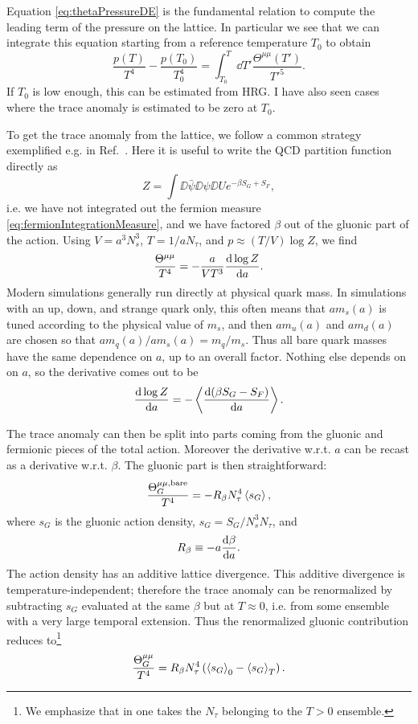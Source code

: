Equation \eqref{eq:thetaPressureDE} is the fundamental relation to compute
the leading term of the pressure on the lattice. In particular we see that we
can integrate this equation starting from a reference temperature $T_0$ to obtain
\begin{equation}
\frac{p(T)}{T^4}-\frac{p(T_0)}{T_0^4}
=\int_{T_0}^T \dd{T'}\frac{\Theta^{\mu\mu}(T')}{T'^5}.
\end{equation}
If $T_0$ is low enough, this can be estimated from HRG. I have also seen cases
where the trace anomaly is estimated to be zero at $T_0$.

To get the trace anomaly from the lattice, we follow a common strategy
exemplified e.g. in Ref.~\cite{bazavov_equation_2014}. Here it is useful
to write the QCD partition function directly as
\begin{equation}
  Z=\int\DD\bar\psi\DD\psi\DD U e^{-\beta S_G+S_F},
\end{equation}
i.e. we have not integrated out the fermion measure
\eqref{eq:fermionIntegrationMeasure}, and we have factored $\beta$ out
of the gluonic part of the action. Using $V=a^3N_s^3$, $T=1/aN_\tau$,
and $p\approx (T/V)\log Z$, we find
\begin{equation}
\frac{\Theta^{\mu\mu}}{T^4}=-\frac{a}{VT^3}\dv{\log Z}{a}.
\end{equation}
Modern simulations generally run directly at physical quark mass. In simulations
with an up, down, and strange quark only, this often means that $am_s(a)$ is tuned 
according to the physical value of $m_s$, and then $am_u(a)$ and
$am_d(a)$ are chosen so that $am_q(a)/am_s(a)=m_q/m_s$.
Thus all bare quark masses have the same dependence on $a$, up to an overall
factor. Nothing else depends on on $a$, so the derivative comes out to be
\begin{equation}
\dv{\log Z}{a}=-\ev{\dv{(\beta S_G-S_F)}{a}}.
\end{equation}

The trace anomaly can then be split into parts coming from the gluonic and
fermionic pieces of the total action. Moreover the derivative w.r.t. $a$ can be
recast as a derivative w.r.t. $\beta$. The gluonic part is then straightforward:
\begin{equation}\label{eq:TAGbare}
\frac{\Theta^{\mu\mu,{\rm bare}}_G}{T^4}=-R_\beta N_\tau^4 \ev{s_G},
\end{equation}
where $s_G$ is the gluonic action density, $s_G=S_G/N_s^3N_\tau$, and
\begin{equation}
R_\beta\equiv-a\dv{\beta}{a}.
\end{equation}
The action density has an additive lattice divergence. This
additive divergence is temperature-independent; therefore the trace anomaly
can be renormalized by subtracting $s_G$ evaluated at the same $\beta$ but
at $T\approx 0$, i.e. from some ensemble with a very large temporal extension.
Thus the renormalized gluonic contribution reduces to\footnote{We emphasize 
that in  one takes the $N_\tau$ belonging to the $T>0$
ensemble.}
\begin{equation}\label{eq:TAG}
\frac{\Theta^{\mu\mu}_G}{T^4}=R_\beta
N_\tau^4\left(\ev{s_G}_0-\ev{s_G}_T\right).
\end{equation}


